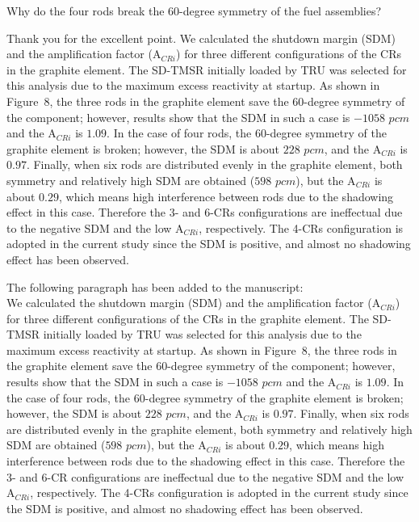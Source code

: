 \documentclass[answers,11pt]{exam}
\begin{document}
\begin{questions}
\begin{solution}
        \end{solution}

        \question Why do the four rods break the 60-degree symmetry of the fuel assemblies?
        
        \begin{solution}
                 Thank you for the excellent point. We calculated the shutdown margin (SDM) and the amplification factor (A$_{CRi}$) for three different configurations of the CRs in the graphite element. The SD-TMSR initially loaded by TRU was selected for this analysis due to the maximum excess reactivity at startup. As shown in Figure~8, the three rods in the graphite element save the 60-degree symmetry of the component; however, results show that the SDM in such a case is $-1058$ $pcm$ and the A$_{CRi}$ is $1.09$. In the case of four rods, the 60-degree symmetry of the graphite element is broken; however, the SDM is about $228$ $pcm$, and the A$_{CRi}$ is $0.97$. Finally, when six rods are distributed evenly in the graphite element, both symmetry and relatively high SDM are obtained ($598$ $pcm$), but the A$_{CRi}$ is about $0.29$, which means high interference between rods due to the shadowing effect in this case. Therefore the 3- and 6-CRs configurations are ineffectual due to the negative SDM and the low A$_{CRi}$, respectively. The 4-CRs configuration is adopted in the current study since the SDM is positive, and almost no shadowing effect has been observed.
                 
                 The following paragraph has been added to the manuscript:\\
               
We calculated the shutdown margin (SDM) and the amplification factor (A$_{CRi}$) for three different configurations of the CRs in the graphite element. The SD-TMSR initially loaded by TRU was selected for this analysis due to the maximum excess reactivity at startup. As shown in Figure~8, the three rods in the graphite element save the 60-degree symmetry of the component; however, results show that the SDM in such a case is $-1058$ $pcm$ and the A$_{CRi}$ is $1.09$. In the case of four rods, the 60-degree symmetry of the graphite element is broken; however, the SDM is about $228$ $pcm$, and the A$_{CRi}$ is $0.97$. Finally, when six rods are distributed evenly in the graphite element, both symmetry and relatively high SDM are obtained ($598$ $pcm$), but the A$_{CRi}$ is about $0.29$, which means high interference between rods due to the shadowing effect in this case. Therefore the 3- and 6-CR configurations are ineffectual due to the negative SDM and the low A$_{CRi}$, respectively. The 4-CRs configuration is adopted in the current study since the SDM is positive, and almost no shadowing effect has been observed.



\end{solution}
\end{questions}
\end{document}
